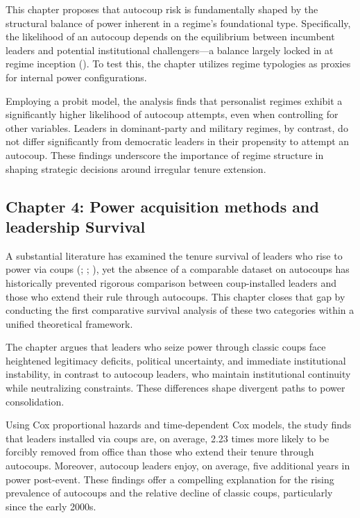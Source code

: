 \documentclass[
  12pt,
]{report}
\begin{document}
This chapter proposes that autocoup risk is fundamentally shaped by the
structural balance of power inherent in a regime's foundational type.
Specifically, the likelihood of an autocoup depends on the equilibrium
between incumbent leaders and potential institutional challengers---a
balance largely locked in at regime inception
(). To test
this, the chapter utilizes regime typologies as proxies for internal
power configurations.

Employing a probit model, the analysis finds that personalist regimes
exhibit a significantly higher likelihood of autocoup attempts, even
when controlling for other variables. Leaders in dominant-party and
military regimes, by contrast, do not differ significantly from
democratic leaders in their propensity to attempt an autocoup. These
findings underscore the importance of regime structure in shaping
strategic decisions around irregular tenure extension.

\subsection*{Chapter 4: Power acquisition methods and leadership
Survival}\label{chapter-4-power-acquisition-methods-and-leadership-survival}

A substantial literature has examined the tenure survival of leaders who
rise to power via coups (; ;
), yet the absence of
a comparable dataset on autocoups has historically prevented rigorous
comparison between coup-installed leaders and those who extend their
rule through autocoups. This chapter closes that gap by conducting the
first comparative survival analysis of these two categories within a
unified theoretical framework.

The chapter argues that leaders who seize power through classic coups
face heightened legitimacy deficits, political uncertainty, and
immediate institutional instability, in contrast to autocoup leaders,
who maintain institutional continuity while neutralizing constraints.
These differences shape divergent paths to power consolidation.

Using Cox proportional hazards and time-dependent Cox models, the study
finds that leaders installed via coups are, on average, 2.23 times more
likely to be forcibly removed from office than those who extend their
tenure through autocoups. Moreover, autocoup leaders enjoy, on average,
five additional years in power post-event. These findings offer a
compelling explanation for the rising prevalence of autocoups and the
relative decline of classic coups, particularly since the early 2000s.
\end{document}
